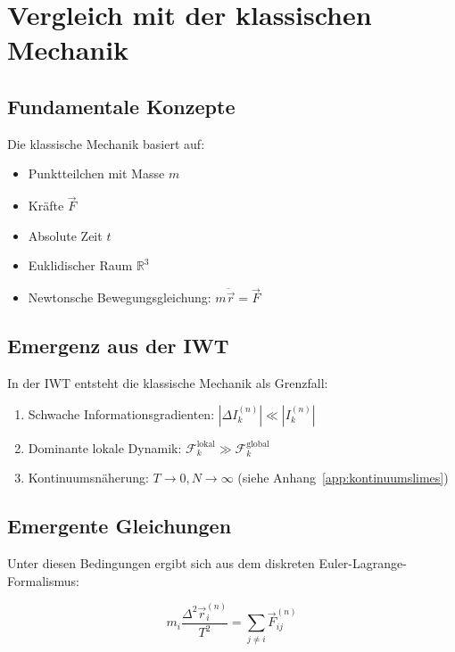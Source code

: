 \section{Vergleich mit der klassischen Mechanik}
\label{app:vergleich_klassisch}

\subsection{Fundamentale Konzepte}
\label{sub:vergleich_klassisch_konzepte}

Die klassische Mechanik basiert auf:

\begin{itemize}
    \item Punktteilchen mit Masse \( m \)
    \item Kräfte \( \vec{F} \)
    \item Absolute Zeit \( t \)
    \item Euklidischer Raum \( \mathbb{R}^3 \)
    \item Newtonsche Bewegungsgleichung: \( m\ddot{\vec{r}} = \vec{F} \)
\end{itemize}

\subsection{Emergenz aus der IWT}
\label{sub:vergleich_klassisch_emergenz}

In der IWT entsteht die klassische Mechanik als Grenzfall:

\begin{enumerate}
    \item Schwache Informationsgradienten: \( |\Delta I_k^{(n)}| \ll |I_k^{(n)}| \)
    \item Dominante lokale Dynamik: \( \mathcal{F}_k^{\text{lokal}} \gg \mathcal{F}_k^{\text{global}} \)
    \item Kontinuumsnäherung: \( T \to 0, N \to \infty \) (siehe Anhang~\ref{app:kontinuumslimes})
\end{enumerate}

\subsection{Emergente Gleichungen}
\label{sub:vergleich_klassisch_gleichungen}

Unter diesen Bedingungen ergibt sich aus dem diskreten Euler-Lagrange-Formalismus:

\[
m_i \frac{\Delta^2 \vec{r}_i^{(n)}}{T^2} = \sum_{j \neq i} \vec{F}_{ij}^{(n)}
\]

